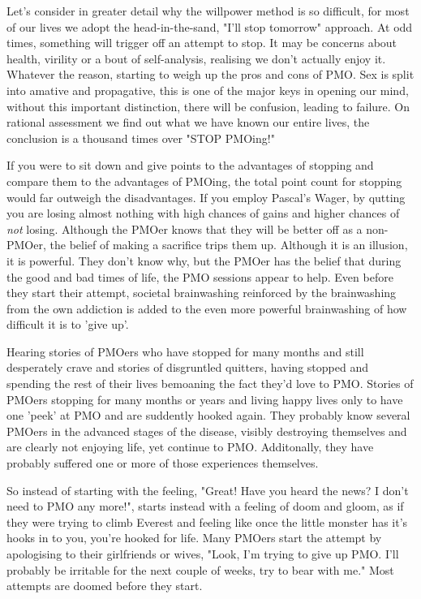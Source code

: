 \documentclass[easypeasy.tex]{subfiles}
\begin{document}
Let's consider in greater detail why the willpower method is so difficult, for most of our lives we adopt the head-in-the-sand, "I'll stop tomorrow" approach. At odd times, something will trigger off an attempt to stop. It may be concerns about health, virility or a bout of self-analysis, realising we don't actually enjoy it. Whatever the reason, starting to weigh up the pros and cons of PMO. Sex is split into amative and propagative, this is one of the major keys in opening our mind, without this important distinction, there will be confusion, leading to failure. On rational assessment we find out what we have known our entire lives, the conclusion is a thousand times over "STOP PMOing!"

If you were to sit down and give points to the advantages of stopping and compare them to the advantages of PMOing, the total point count for stopping would far outweigh the disadvantages. If you employ Pascal's Wager, by qutting you are losing almost nothing with high chances of gains and higher chances of \textit{not} losing. Although the PMOer knows that they will be better off as a non-PMOer, the belief of making a sacrifice trips them up. Although it is an illusion, it is powerful. They don't know why, but the PMOer has the belief that during the good and bad times of life, the PMO sessions appear to help. Even before they start their attempt, societal brainwashing reinforced by the brainwashing from the own addiction is added to the even more powerful brainwashing of how difficult it is to 'give up'.

Hearing stories of PMOers who have stopped for many months and still desperately crave and stories of disgruntled quitters, having stopped and spending the rest of their lives bemoaning the fact they'd love to PMO. Stories of PMOers stopping for many months or years and living happy lives only to have one 'peek' at PMO and are suddently hooked again. They probably know several PMOers in the advanced stages of the disease, visibly destroying themselves and are clearly not enjoying life, yet continue to PMO. Additonally, they have probably suffered one or more of those experiences themselves.

So instead of starting with the feeling, "Great! Have you heard the news? I don't need to PMO any more!", starts instead with a feeling of doom and gloom, as if they were trying to climb Everest and feeling like once the little monster has it's hooks in to you, you're hooked for life. Many PMOers start the attempt by apologising to their girlfriends or wives, "Look, I'm trying to give up PMO. I'll probably be irritable for the next couple of weeks, try to bear with me." Most attempts are doomed before they start.
\end{document}
